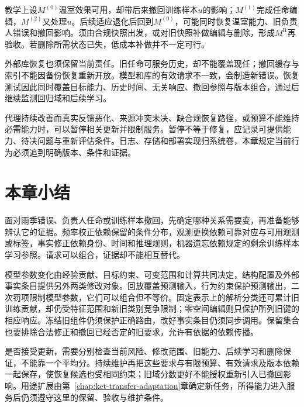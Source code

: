 教学上设$M^{(0)}$温室效果可用，却带后来撤回训练样本$u$的影响；$M^{(1)}$完成任命编辑，$M^{(2)}$又处理$u$。后续适应退化后回到$M^{(0)}$，可能同时恢复温室能力、旧负责人错误和撤回影响。须由合规快照出发，或对旧快照补做编辑与删除，形成$M^{\mathrm R}$再验收。若删除所需状态已失，低成本补做并不一定可行。

外部库恢复也须保留当前责任。旧任命可服务历史，却不能覆盖现任；撤回缓存与索引不能因备份恢复重新开放。模型和库的有效请求不一致，会制造新错误。恢复测试因此同时覆盖目标能力、历史时间、无关响应、撤回参照与版本组合，通过后继续监测回归域和后续学习。

代理持续改善而真实反馈恶化、来源冲突未决、缺合规恢复路径，或预算不能维持必需能力时，可以暂停相关更新并限制服务。暂停不等于修复，应记录可提供能力、待决问题与重新评估条件。日志、存储和部署实现归系统卷，本章规定当前行为必须追到明确版本、条件和证据。

\FloatBarrier
\section{本章小结}
\label{sec:ket-update-summary}

面对雨季错误、负责人任命或训练样本撤回，先确定哪种关系需要变，再准备能够辨认它的证据。频率校正依赖保留的条件分布，观测更换依赖可靠对应与可用观测或标签，事实修正依赖身份、时间和推理规则，机器遗忘依赖规定的剩余训练样本学习参照。请求可以组合，证据却不能相互替代。

模型参数变化由经验贡献、目标约束、可变范围和计算共同决定，结构配置及外部事实条目提供另外两类修改对象。回放覆盖预测输入，行为约束保护预测输出，二次罚项限制模型参数，它们可以组合但不等价。固定表示上的解析分类还可累计旧训练贡献，却仍受特征范围和新旧类别竞争限制；零空间编辑则只保护所列旧键的相应响应。冻结旧组件仍须保护正确路由，改好事实条目仍须同步调用。保留集合也要排除合法修正和撤回已经否定的旧要求，允许有依据的依赖传播。

是否接受更新，需要分别检查当前风险、修改范围、旧能力、后续学习和删除保证，不能靠一个平均分。持续维护再把这些要求与有限预算、有效请求及版本依赖一起保存，使恢复候选也受相同约束；旧域分数更好不能授权重新引入已撤回影响。用途扩展由第~\ref{chap:ket-transfer-adaptation}章确定新任务，所得能力进入服务后仍须遵守这里的保留、验收与维护条件。
